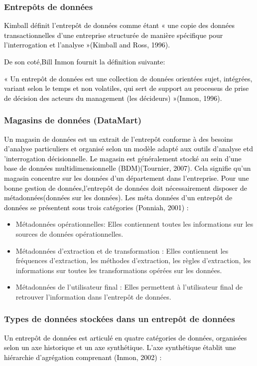 \documentclass[a4paper,12pt]{report}
\begin{document}
\subsubsection{Entrepôts de données}
\textcolor{black}{Kimball définit l’entrepôt de données comme étant « une copie des données transactionnelles d’une entreprise structurée de manière spécifique pour l’interrogation et l’analyse »(Kimball and Ross, 1996).}

\textcolor{black}{De son coté,Bill Inmon fournit la définition suivante:

« Un entrepôt de données est une collection de données orientées sujet, intégrées, variant selon le temps et non volatiles, qui sert de support au processus de prise de décision des acteurs du management (les décideurs) »(Inmon, 1996).}

\subsubsection{Magasins de données (DataMart)}
\textcolor{black}{Un magasin de données est un extrait de l’entrepôt conforme à des besoins d’analyse particuliers et organisé selon un modèle adapté aux outils d’analyse etd ’interrogation
décisionnelle. Le magasin est généralement stocké au sein d’une base de données multidimensionnelle (BDM)(Tournier, 2007). Cela signifie qu’un magasin concentre sur les données d’un département dans l’entreprise.}
\textcolor{black}{Pour une bonne gestion de données,l’entrepôt de données doit nécessairement disposer de métadonnées(données sur les données).}
\textcolor{black}{Les méta données d’un entrepôt de données se présentent sous trois catégories (Ponniah, 2001) :}

\begin{itemize}
	\item  Métadonnées opérationnelles: Elles contiennent toutes les informations sur les sources de données opérationnelles.
	\item  Métadonnées d’extraction et de transformation : Elles contiennent les fréquences d’extraction, les méthodes d’extraction, les règles d’extraction, les informations sur toutes les transformations opérées sur les données.
	\item  Métadonnées de l’utilisateur final : Elles permettent à l’utilisateur final de retrouver l’information dans l’entrepôt de données.

\end{itemize}	

\subsubsection{Types de données stockées dans un entrepôt de données}
\textcolor{black}{Un entrepôt de données est articulé en quatre catégories de données, organisées selon un axe historique et un axe synthétique.}
\textcolor{black}{L’axe synthétique établit une hiérarchie d’agrégation comprenant (Inmon, 2002) :}
\end{document}
